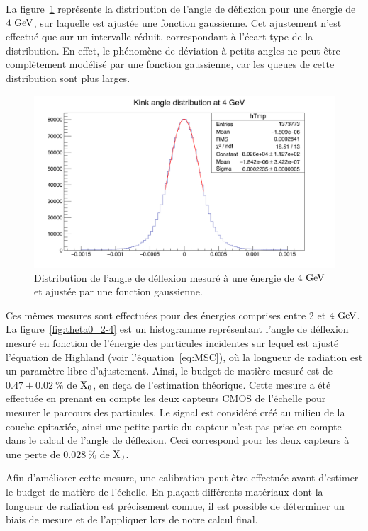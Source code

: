   La figure~\ref{fig:angleX0} représente la distribution de l'angle de déflexion pour une énergie de $4~\rm{GeV}$, sur laquelle est ajustée une fonction gaussienne.
  Cet ajustement n'est effectué que sur un intervalle réduit, correspondant à l'écart-type de la distribution.
  En effet, le phénomène de déviation à petits angles ne peut être complètement modélisé par une fonction gaussienne, car les queues de cette distribution sont plus larges.
    
  \begin{figure}[!h]
    \centering
    \includegraphics[width = \textwidth]{Pictures/X0/kinkAngle4GeV.png}
    \caption{Distribution de l'angle de déflexion mesuré à une énergie de $4~\rm{GeV}$ et ajustée par une fonction gaussienne.}
    \label{fig:angleX0}
  \end{figure} 

  Ces mêmes mesures sont effectuées pour des énergies comprises entre 2 et $4~\rm{GeV}$.
  La figure~\ref{fig:theta0_2-4} est un histogramme représentant l'angle de déflexion mesuré en fonction de l'énergie des particules incidentes sur lequel est ajusté l'équation de Highland (voir l'équation~\ref{eq:MSC}), où la longueur de radiation est un paramètre libre d'ajustement.
  Ainsi, le budget de matière mesuré est de $0.47 \pm 0.02~\%$ de $\rm{X_0}$, en deça de l'estimation théorique.
  Cette mesure a été effectuée en prenant en compte les deux capteurs \gls{CMOS} de l'échelle pour mesurer le parcours des particules.
  Le signal est considéré créé au milieu de la couche epitaxiée, ainsi une petite partie du capteur n'est pas prise en compte dans le calcul de l'angle de déflexion.
  Ceci correspond pour les deux capteurs à une perte de $0.028~\%$ de $\rm{X_{0}}$.

  Afin d'améliorer cette mesure, une calibration peut-être effectuée avant d'estimer le budget de matière de l'échelle.
  En plaçant différents matériaux dont la longueur de radiation est précisement connue, il est possible de déterminer un biais de mesure et de l'appliquer lors de notre calcul final.

